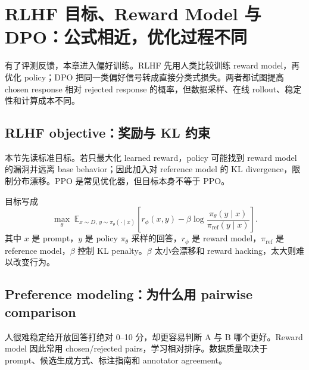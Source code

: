 \section{RLHF 目标、Reward Model 与 DPO：公式相近，优化过程不同}

有了评测反馈，本章进入偏好训练。RLHF 先用人类比较训练 reward model，再优化 policy；DPO 把同一类偏好信号转成直接分类式损失。两者都试图提高 chosen response 相对 rejected response 的概率，但数据采样、在线 rollout、稳定性和计算成本不同。

\subsection{RLHF objective：奖励与 KL 约束}

本节先读标准目标。若只最大化 learned reward，policy 可能找到 reward model 的漏洞并远离 base behavior；因此加入对 reference model 的 KL divergence，限制分布漂移。PPO 是常见优化器，但目标本身不等于 PPO。




目标写成
\[
\max_{\theta}\;\mathbb{E}_{x\sim D,\,y\sim\pi_{\theta}(\cdot\mid x)}
\left[r_{\phi}(x,y)-\beta\log\frac{\pi_{\theta}(y\mid x)}{\pi_{\mathrm{ref}}(y\mid x)}\right].
\]
其中 $x$ 是 prompt，$y$ 是 policy $\pi_{\theta}$ 采样的回答，$r_{\phi}$ 是 reward model，$\pi_{\mathrm{ref}}$ 是 reference model，$\beta$ 控制 KL penalty。$\beta$ 太小会漂移和 reward hacking，太大则难以改变行为。


\subsection{Preference modeling：为什么用 pairwise comparison}

人很难稳定给开放回答打绝对 0--10 分，却更容易判断 A 与 B 哪个更好。Reward model 因此常用 chosen/rejected pairs，学习相对排序。数据质量取决于 prompt、候选生成方式、标注指南和 annotator agreement。

